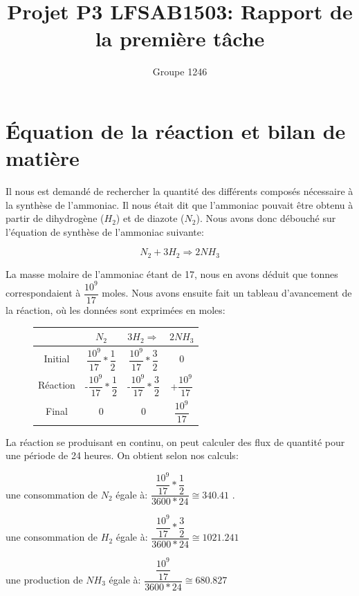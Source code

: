\documentclass[11pt,a4paper]{report}
\author{Groupe 1246}
\title{Projet P3 LFSAB1503: Rapport de la première tâche}
\begin{document}
\maketitle

\section{Équation de la réaction et bilan de matière}

Il nous est demandé de rechercher la quantité des différents composés nécessaire à la synthèse de l'ammoniac.
Il nous était dit que l'ammoniac pouvait être obtenu à partir de dihydrogène ($H_2$) et de diazote ($N_2$). Nous avons
donc débouché sur l'équation de synthèse de l'ammoniac suivante: 

$$N_2 + 3H_2 \Rightarrow 2NH_3$$

La masse molaire de l'ammoniac étant de \unit{17}{\gram\per\meter}, nous en avons déduit que  tonnes correspondaient à 
$\dfrac{10^{9}}{17}$ moles. Nous avons ensuite fait un tableau d'avancement de la réaction, où les données sont exprimées
en moles: 

\begin{figure}[h]
\begin{tabular}{|c|c|c|c|}
\hline 
 & $N_2$ & $3H_2 \Rightarrow$ & $2NH_3$ \\ 
\hline 
Initial & $\dfrac{10^{9}}{17}*\dfrac{1}{2}$ & $\dfrac{10^{9}}{17}*\dfrac{3}{2}$ & 0 \\ 
\hline 
Réaction & -$\dfrac{10^{9}}{17}*\dfrac{1}{2}$ & -$\dfrac{10^{9}}{17}*\dfrac{3}{2}$ & +$\dfrac{10^{9}}{17}$ \\ 
\hline 
Final & 0 & 0 & $\dfrac{10^{9}}{17}$ \\ 
\hline 
\end{tabular} 
\end{figure}

La réaction se produisant en continu, on peut calculer des flux de quantité pour une période de 24 heures.
On obtient selon nos calculs:

\begin{itemize}
  \item{une consommation de $N_2$ égale à: $\dfrac{\dfrac{10^{9}}{17}*\dfrac{1}{2}}{3600*24} \cong 340.41 $ \unit{}{\mole\per\second}.}
  \item{une consommation de $H_2$ égale à: $\dfrac{\dfrac{10^{9}}{17}*\dfrac{3}{2}}{3600*24} \cong 1021.241 $\unit{}{\mole\per\second}
  \item{une production de $NH_3$ égale à: $\dfrac{\dfrac{10^{9}}{17}}{3600*24} \cong 680.827$ \unit{}{\mole\per\second}
}}\end{itemize}
\end{document}

